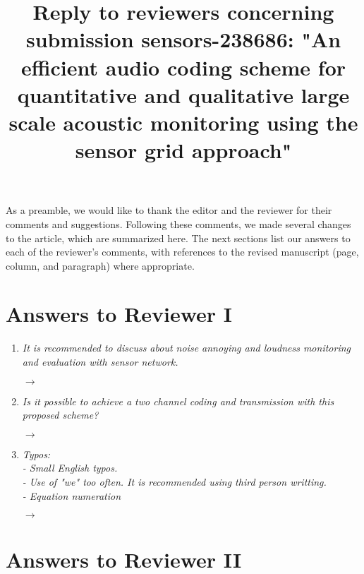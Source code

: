 \documentclass[10pt]{article}
\title{Reply to reviewers concerning submission sensors-238686: "An efficient audio coding scheme  for quantitative and qualitative large scale acoustic monitoring using the sensor grid approach"}
\begin{document}
\maketitle

As a preamble, we would like to thank the editor and the reviewer for their comments and suggestions. Following these comments, we made several changes to the article, which are summarized here. The next sections list our answers to each of the reviewer’s comments, with references to the revised manuscript (page, column, and paragraph) where appropriate.


\section{Answers to Reviewer I}

\begin{enumerate}

\item \emph{It is recommended to discuss about noise annoying and loudness monitoring and evaluation with sensor network.}

$\rightarrow$ 

\item \emph{Is it possible to achieve a two channel coding and transmission with this proposed scheme?}

$\rightarrow$ 

\item \emph{Typos:\\
- Small English typos.\\
- Use of "we" too often. It is recommended using third person writting.\\
- Equation numeration}

$\rightarrow$ 

\end{enumerate}

\section{Answers to Reviewer II}
\end{document}
